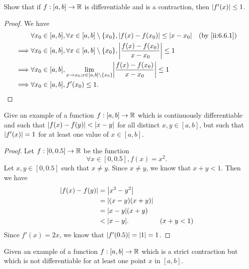 \begin{ex}\label{ii:ex:6.6.2}
  Show that if \(f : [a, b] \to \mathbb{R}\) is differentiable and is a contraction, then \(\left\lvert f'(x)\right\rvert \leq 1\).
\end{ex}

\begin{proof}
  We have
  \begin{align*}
             & \forall x_0 \in [a, b], \forall x \in [a, b] \setminus \set{x_0}, \abs{f(x) - f(x_0)} \leq \abs{x - x_0}                &  & \by{ii:6.6.1} \\
    \implies & \forall x_0 \in [a, b], \forall x \in [a, b] \setminus \set{x_0}, \abs{\dfrac{f(x) - f(x_0)}{x - x_0}} \leq 1                              \\
    \implies & \forall x_0 \in [a, b], \lim_{x \to x_0 ; x \in [a, b] \setminus \set{x_0}} \abs{\dfrac{f(x) - f(x_0)}{x - x_0}} \leq 1                    \\
    \implies & \forall x_0 \in [a, b], f'(x_0) \leq 1.
  \end{align*}
\end{proof}

\begin{ex}\label{ii:ex:6.6.3}
  Give an example of a function \(f : [a, b] \to \mathbb{R}\) which is continuously differentiable and such that \(\left\lvert f(x) - f(y)\right\rvert < \left\lvert x - y\right\rvert\) for all distinct \(x, y \in [a, b]\), but such that \(\left\lvert f'(x)\right\rvert = 1\) for at least one value of \(x \in [a, b]\).
\end{ex}

\begin{proof}
  Let \(f : [0, 0.5] \to \mathbb{R}\) be the function
  \[
    \forall x \in [0, 0.5], f(x) = x^2.
  \]
  Let \(x, y \in [0, 0.5]\) such that \(x \neq y\).
  Since \(x \neq y\), we know that \(x + y < 1\).
  Then we have
  \begin{align*}
    \abs{f(x) - f(y)} & = \abs{x^2 - y^2}                    \\
                      & = \abs{(x - y)(x + y)}               \\
                      & = \abs{x - y} (x + y)                \\
                      & < \abs{x - y}.         & (x + y < 1)
  \end{align*}
  Since \(f'(x) = 2x\), we know that \(\left\lvert f'(0.5)\right\rvert = \left\lvert1\right\rvert = 1\).
\end{proof}

\begin{ex}\label{ii:ex:6.6.4}
  Given an example of a function \(f : [a, b] \to \mathbb{R}\) which is a strict contraction but which is not differentiable for at least one point \(x\) in \([a, b]\).
\end{ex}

